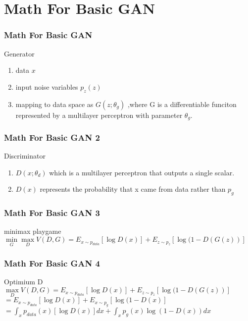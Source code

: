 \documentclass{beamer}[10]
\begin{document}
\section{Math For Basic GAN}
\begin{frame}
  \frametitle{Math For Basic GAN}
  \begin{block}{Generator}
  \begin{enumerate}
    \item data $x$
    \item input noise variables $p_z(z)$
    \item mapping to data space as $G(z;\theta_g)$ ,where G is a differentiable funciton represented by a multilayer perceptron with parameter $\theta_g$.
  \end{enumerate}
\end{block}
\end{frame}

\begin{frame}
  \frametitle{Math For Basic GAN 2}
  \begin{block}{Discriminator}
  \begin{enumerate}
    \item $D(x;\theta_d)$ which is a multilayer perceptron that outputs a single scalar.
    \item $D(x)$ represents the probability that x came from data rather than $p_g$
  \end{enumerate}
  \end{block}
\end{frame}

\begin{frame}
  \frametitle{Math For Basic GAN 3}
  \begin{block}{minimax playgame}
    $\min \limits_{G} \max \limits_{D} V(D,G) = E_{x \sim p_{data}}[\log D(x)] + E_{z \sim p_z}[\log (1 - D(G(z))] $
  \end{block}
\end{frame}

\begin{frame}
  \frametitle{Math For Basic GAN 4}
  \begin{block}{Optimium D }
    $\max \limits_{D} V(D,G) = E_{x \sim p_{data}}[\log D(x)] + E_{z \sim p_z}[\log (1 - D(G(z))] $ 
                            $= E_{x \sim p_{data}}[\log D(x)] + E_{x \sim p_g}[\log (1 - D(x)]     $ 
			    $= \int_{x} p_{data}(x)[\log D(x)] dx + \int_{x} p_g(x) \log (1 - D(x)) dx $
  \end{block}
\end{frame}
\end{document}
